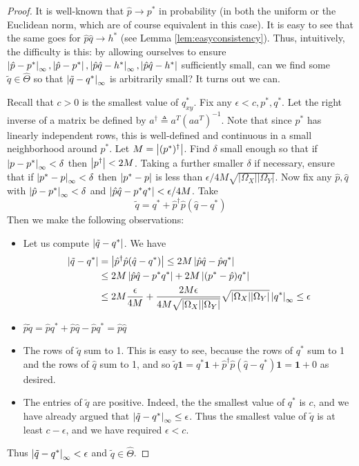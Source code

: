 \begin{proof}
It is well-known that $\hat p\rightarrow p^*$ in probability (in both the uniform or the Euclidean norm, which are of course equivalent in this case).  It is easy to see that the same goes for $\hat p\hat q\rightarrow h^*$ (see Lemma \ref{lem:easyconsistency}).  Thus, intuitively, the difficulty is this: by allowing ourselves to ensure $\left|\hat p - p^*\right|_\infty,\left|\hat p - p^*\right|,\left|\hat p\hat q - h^*\right|_\infty,\left|\hat p\hat q - h^*\right|$ sufficiently small, can we find some $\tilde q\in \hat \Theta$ so that $\left|\tilde q - q^*\right|_\infty$ is arbitrarily small?  It turns out we can.

Recall that $c>0$ is the smallest value of $q^*_{xy}$.  Fix any $\epsilon<c, p^*,q^*$.  Let the right inverse of a matrix be defined by $a^\dagger \triangleq a^T (aa^T)^{-1}$.  Note that since $p^*$ has linearly independent rows, this is well-defined and continuous in a small neighborhood around $p^*$.  Let $M=\left|(p^*)^\dagger\right|$.  Find $\delta$ small enough so that if $\left|p-p^*\right|_\infty<\delta$ then $\left|p^\dagger\right|<2M$.  Taking a further smaller $\delta$ if necessary, ensure that if $\left|p^*-p\right|_\infty<\delta$ then $\left|p^*-p\right|$ is less than $\epsilon / 4M\sqrt{|\Omega_X||\Omega_Y|}$.  
Now fix any $\hat p,\hat q$ with $\left|\hat p-p^*\right|_\infty<\delta$ and $\left|\hat p \hat q - p^*q^*\right|<\epsilon/4M$.  Take
\[
\tilde q = q^* + \hat p^\dagger \hat p (\hat q - q^*)
\] 
Then we make the following observations:
\begin{itemize}
  \item Let us compute $\left|\tilde q -q^*\right|$. We have
   \begin{align*}
   \left|\tilde q -q^*\right| &= \left|\hat p^\dagger \hat p (\hat q - q^*)\right| \leq 2M \left|\hat p \hat q - \hat p q^*\right| \\
        &\leq 2M \left|\hat p \hat q - p^* q^*\right| + 2M\left|(p^* - \hat p)q^*\right|\\
        &\leq 2M \frac{\epsilon}{4M} + \frac{2M\epsilon}{4M\sqrt{|\Omega_X||\Omega_Y|}}\sqrt{|\Omega_X||\Omega_Y|}\left|q^*\right|_\infty \leq \epsilon 
   \end{align*}
  \item $\hat p \tilde q = \hat p q^* + \hat p \hat q - \hat p q^* = \hat p \hat q$
  \item The rows of $\tilde q$ sum to 1.  This is easy to see, because the rows of $q^*$ sum to 1 and the rows of $\hat q$ sum to 1, and so $\tilde q \mathbf{1} = q^* \mathbf{1} + \hat p^\dagger \hat p (\hat q - q^*) \mathbf{1} = \mathbf{1} + 0$ as desired.
  \item The entries of $\tilde q$ are positive.   Indeed, the the smallest value of $q^*$ is $c$, and we have already argued that $\left|\tilde q - q^*\right|_\infty\leq \epsilon$.  Thus the smallest value of $\tilde q$ is at least $c-\epsilon$, and we have required $\epsilon<c$.  
\end{itemize}
Thus $\left|\tilde q - q^*\right|_\infty<\epsilon$ and $\tilde q \in \hat \Theta$.  


\end{proof}
